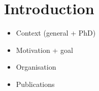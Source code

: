 \documentclass[a4paper,11pt,twoside]{StyleThese}
\begin{document}
\fi


\chapter*{Introduction}
\begin{itemize}
\item Context (general + PhD)
\item Motivation + goal
\item Organisation
\item Publications
\end{itemize}

\cite{dautenhahn2007socially}

\ifdefined{}
\else


\end{document}

